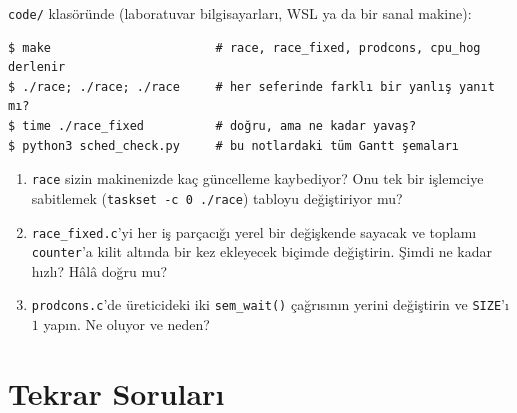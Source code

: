 \documentclass[11pt,a4paper]{article}
\newcommand{\cmd}[1]{\texttt{#1}}
\begin{document}
\begin{tryit}
\texttt{code/} klasöründe (laboratuvar bilgisayarları, WSL ya da bir sanal makine):
\begin{lstlisting}[style=term]
$ make                       # race, race_fixed, prodcons, cpu_hog derlenir
$ ./race; ./race; ./race     # her seferinde farklı bir yanlış yanıt mı?
$ time ./race_fixed          # doğru, ama ne kadar yavaş?
$ python3 sched_check.py     # bu notlardaki tüm Gantt şemaları
\end{lstlisting}
\begin{enumerate}[leftmargin=1.4em]
  \item \texttt{race} sizin makinenizde kaç güncelleme kaybediyor? Onu tek bir işlemciye sabitlemek (\cmd{taskset -c 0 ./race}) tabloyu değiştiriyor mu?
  \item \texttt{race\_fixed.c}'yi her iş parçacığı yerel bir değişkende sayacak ve toplamı \texttt{counter}'a kilit altında bir kez ekleyecek biçimde değiştirin. Şimdi ne kadar hızlı? Hâlâ doğru mu?
  \item \texttt{prodcons.c}'de üreticideki iki \cmd{sem\_wait()} çağrısının yerini değiştirin ve \texttt{SIZE}'ı $1$ yapın. Ne oluyor ve neden?
\end{enumerate}
\end{tryit}

\section{Tekrar Soruları}
\end{document}
